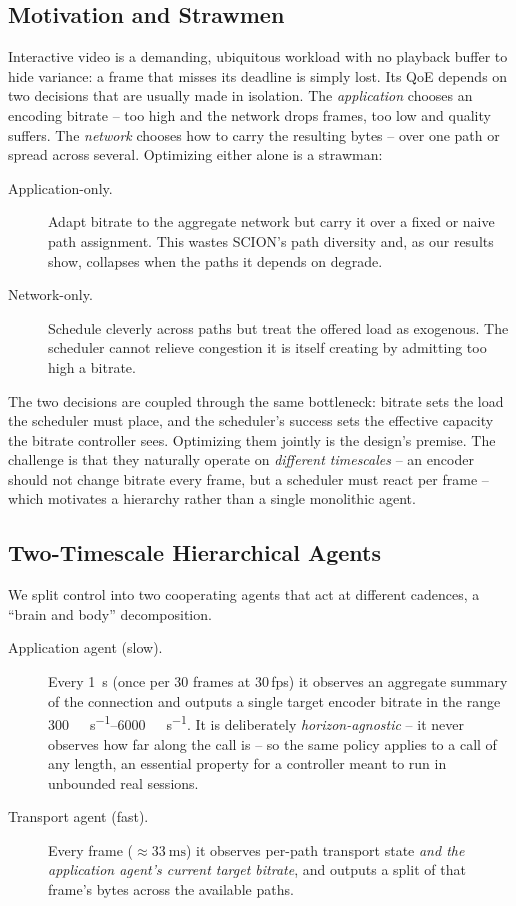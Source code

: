 \subsection{Motivation and Strawmen}
\label{sec:p2design:motivation}

Interactive video is a demanding, ubiquitous workload with no playback buffer to hide variance: a frame
that misses its deadline is simply lost. Its QoE depends on two decisions that are usually made in
isolation. The \emph{application} chooses an encoding bitrate -- too high and the network drops frames,
too low and quality suffers. The \emph{network} chooses how to carry the resulting bytes -- over one path
or spread across several. Optimizing either alone is a strawman:

\begin{description}
  \item[Application-only.] Adapt bitrate to the aggregate network but carry it over a fixed or naive
  path assignment. This wastes SCION's path diversity and, as our results show, collapses when the paths
  it depends on degrade.
  \item[Network-only.] Schedule cleverly across paths but treat the offered load as exogenous. The
  scheduler cannot relieve congestion it is itself creating by admitting too high a bitrate.
\end{description}

The two decisions are coupled through the same bottleneck: bitrate sets the load the scheduler must
place, and the scheduler's success sets the effective capacity the bitrate controller sees. Optimizing
them jointly is the design's premise. The challenge is that they naturally operate on \emph{different
timescales} -- an encoder should not change bitrate every frame, but a scheduler must react per frame --
which motivates a hierarchy rather than a single monolithic agent.

\subsection{Two-Timescale Hierarchical Agents}
\label{sec:p2design:hierarchy}

We split control into two cooperating agents that act at different cadences, a ``brain and body''
decomposition.

\begin{description}
  \item[Application agent (slow).] Every \SI{1}{\second} (once per 30 frames at 30\,fps) it observes
  an aggregate summary of the connection and outputs a single target encoder bitrate in the range
  \SIrange{300}{6000}{\kilo\bit\per\second}. It is deliberately \emph{horizon-agnostic} -- it never
  observes how far along the call is -- so the same policy applies to a call of any length, an essential
  property for a controller meant to run in unbounded real sessions.
  \item[Transport agent (fast).] Every frame (${\approx}\SI{33}{\milli\second}$) it observes per-path
  transport state \emph{and the application agent's current target bitrate}, and outputs a split of that
  frame's bytes across the available paths.
\end{description}

